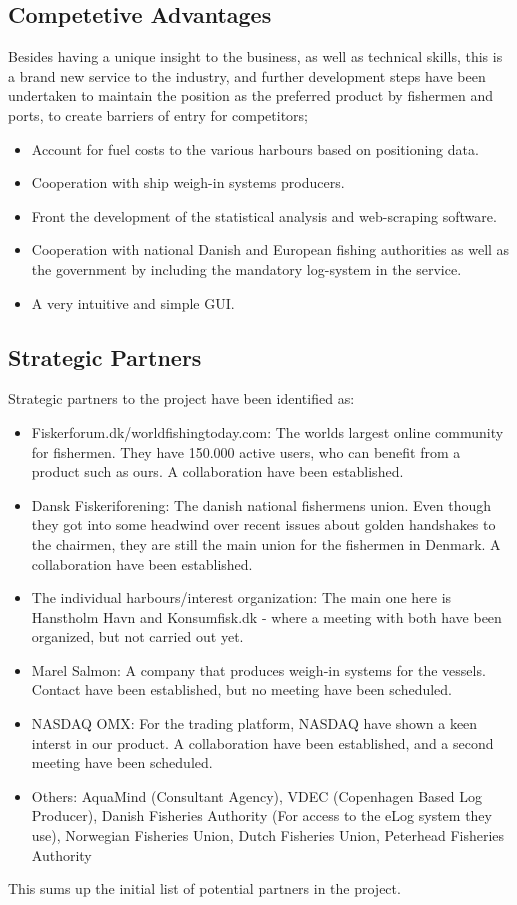 \documentclass[12pt]{article}
\begin{document}
\subsection{Competetive Advantages}
Besides having a unique insight to the business, as well as technical skills, this is a brand new service to the industry, and further development steps have been undertaken to maintain the position as the preferred product by fishermen and ports, to create barriers of entry for competitors; 

\begin{itemize}
	\item Account for fuel costs to the various harbours based on positioning data.
	\item Cooperation with ship weigh-in systems producers.
	\item Front the development of the statistical analysis and web-scraping software.
	\item Cooperation with national Danish and European fishing authorities as well as the government by including the mandatory log-system in the service.
	\item A very intuitive and simple GUI.
\end{itemize} 

\subsection{Strategic Partners}
Strategic partners to the project have been identified as:
\begin{itemize}
	\item Fiskerforum.dk/worldfishingtoday.com: The worlds largest online community for fishermen. They have 150.000 active users, who can benefit from a product such as ours. A collaboration have been established.
	\item Dansk Fiskeriforening: The danish national fishermens union. Even though they got into some headwind over recent issues about golden handshakes to the chairmen, they are still the main union for the fishermen in Denmark. A collaboration have been established.
	\item The individual harbours/interest organization: The main one here is Hanstholm Havn and Konsumfisk.dk - where a meeting with both have been organized, but not carried out yet. 
	\item Marel Salmon: A company that produces weigh-in systems for the vessels. Contact have been established, but no meeting have been scheduled.
	\item NASDAQ OMX: For the trading platform, NASDAQ have shown a keen interst in our product. A collaboration have been established, and a second meeting have been scheduled.
	\item Others: AquaMind (Consultant Agency), VDEC (Copenhagen Based Log Producer), Danish Fisheries Authority (For access to the eLog system they use), Norwegian Fisheries Union, Dutch Fisheries Union, Peterhead Fisheries Authority
\end{itemize}
This sums up the initial list of potential partners in the project.
\end{document}
